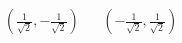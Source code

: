 \begin{align*}
 (\frac{1}{\sqrt{2}},-\frac{1}{\sqrt{2}}) & & (-\frac{1}{\sqrt{2}},\frac{1}{\sqrt{2}})
\end{align*}
